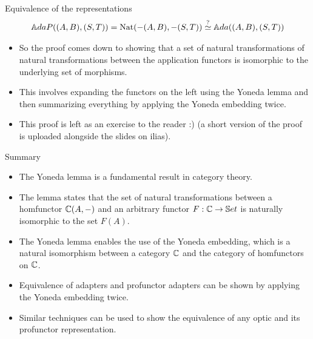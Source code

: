 \fi
\begin{frame}{Equivalence of the representations}
	\begin{align*}
		\mathbb{A}daP ((A,B),(S,T)) = \text{Nat}(-(A, B), -(S, T)) \overset{?}{\simeq} {\mathbb{A}da}((A,B), (S,T))
	\end{align*}
	\begin{itemize}
		\pause\item So the proof comes down to showing that a set of natural transformations of natural transformations between the application functors is isomorphic to the underlying set of morphisms.
		\pause\item This involves expanding the functors on the left using the Yoneda lemma and then summarizing everything by applying the Yoneda embedding twice.
		\pause\item This proof is left as an exercise to the reader :) \pause(a short version of the proof is uploaded alongside the slides on ilias).
	\end{itemize}
\end{frame}
\begin{frame}{Summary}
	\begin{itemize}
		\item The Yoneda lemma is a fundamental result in category theory.
		\pause\item The lemma states that the set of natural transformations between a homfunctor $\mathbb{C}(A, -)$ and an arbitrary functor $F : \mathbb{C} \to \mathbb{S}et$ is naturally isomorphic to the set $F(A)$.
		\pause\item The Yoneda lemma enables the use of the Yoneda embedding, which is a natural isomorphism between a category $\mathbb{C}$ and the category of homfunctors on $\mathbb{C}$.
		\pause\item Equivalence of adapters and profunctor adapters can be shown by applying the Yoneda embedding twice.
		\pause\item Similar techniques can be used to show the equivalence of any optic and its profunctor representation.
	\end{itemize}
\end{frame}
